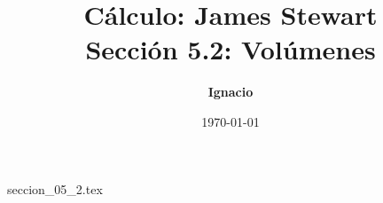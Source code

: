 \documentclass[11pt,spanish,oneside]{report}
\title{\textbf{Cálculo: James Stewart} \\ \Large Sección 5.2: Volúmenes}
\author{\textbf{Ignacio}}
\date{\today}
\begin{document}
\maketitle

{seccion_05_2.tex}
\end{document}
